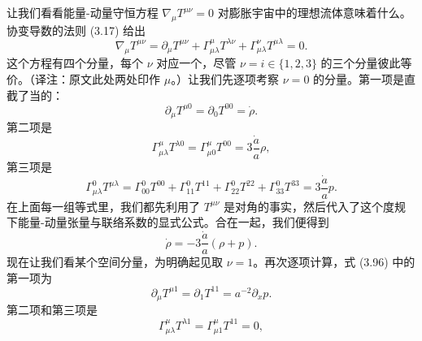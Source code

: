 让我们看看能量-动量守恒方程 $\nabla_\mu T^{\mu\nu} = 0$ 对膨胀宇宙中的理想流体意味着什么。协变导数的法则 (3.17) 给出
\begin{equation*}
\nabla_\mu T^{\mu\nu} = \partial_\mu T^{\mu\nu} + \Gamma^\mu_{\mu\lambda}T^{\lambda\nu} + \Gamma^\nu_{\mu\lambda}T^{\mu\lambda} = 0.
\tag{3.96}
\end{equation*}
这个方程有四个分量，每个 $\nu$ 对应一个，尽管 $\nu = i \in \{1, 2, 3\}$ 的三个分量彼此等价。（译注：原文此处两处印作 $\mu$。）让我们先逐项考察 $\nu = 0$ 的分量。第一项是直截了当的：
\begin{equation*}
\partial_\mu T^{\mu 0} = \partial_0 T^{00} = \dot{\rho}.
\tag{3.97}
\end{equation*}
第二项是
\begin{equation*}
\Gamma^\mu_{\mu\lambda}T^{\lambda 0} = \Gamma^\mu_{\mu 0}T^{00} = 3\frac{\dot{a}}{a}\rho,
\tag{3.98}
\end{equation*}
第三项是
\begin{equation*}
\Gamma^0_{\mu\lambda}T^{\mu\lambda} = \Gamma^0_{00}T^{00} + \Gamma^0_{11}T^{11} + \Gamma^0_{22}T^{22} + \Gamma^0_{33}T^{33} = 3\frac{\dot{a}}{a}p.
\tag{3.99}
\end{equation*}
在上面每一组等式里，我们都先利用了 $T^{\mu\nu}$ 是对角的事实，然后代入了这个度规下能量-动量张量与联络系数的显式公式。合在一起，我们便得到
\begin{equation*}
\dot{\rho} = -3\frac{\dot{a}}{a}(\rho + p).
\tag{3.100}
\end{equation*}
现在让我们看某个空间分量，为明确起见取 $\nu = 1$。再次逐项计算，式 (3.96) 中的第一项为
\begin{equation*}
\partial_\mu T^{\mu 1} = \partial_1 T^{11} = a^{-2}\partial_x p.
\tag{3.101}
\end{equation*}
第二项和第三项是
\begin{equation*}
\Gamma^\mu_{\mu\lambda}T^{\lambda 1} = \Gamma^\mu_{\mu 1}T^{11} = 0,
\tag{3.102}
\end{equation*}

